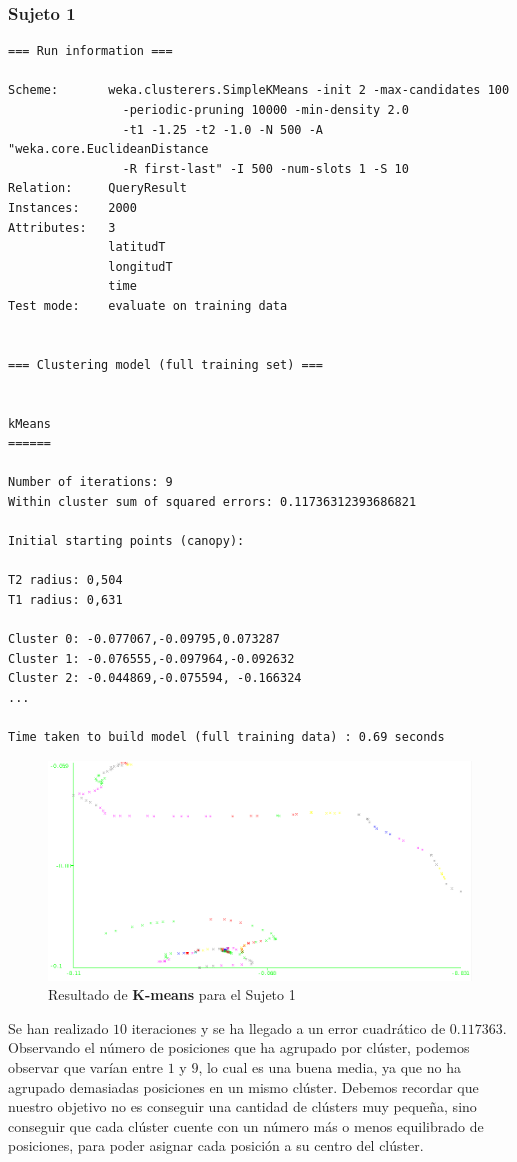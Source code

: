 \documentclass[a4paper, 12pt, spanish]{article}
\begin{document}
\subsubsection{Sujeto 1}

\begin{verbatim}
=== Run information ===

Scheme:       weka.clusterers.SimpleKMeans -init 2 -max-candidates 100 
				-periodic-pruning 10000 -min-density 2.0 
				-t1 -1.25 -t2 -1.0 -N 500 -A "weka.core.EuclideanDistance 
				-R first-last" -I 500 -num-slots 1 -S 10
Relation:     QueryResult
Instances:    2000
Attributes:   3
              latitudT
              longitudT
              time
Test mode:    evaluate on training data


=== Clustering model (full training set) ===


kMeans
======

Number of iterations: 9
Within cluster sum of squared errors: 0.11736312393686821

Initial starting points (canopy):

T2 radius: 0,504     
T1 radius: 0,631  

Cluster 0: -0.077067,-0.09795,0.073287
Cluster 1: -0.076555,-0.097964,-0.092632
Cluster 2: -0.044869,-0.075594, -0.166324
...

Time taken to build model (full training data) : 0.69 seconds
\end{verbatim}


\begin{figure}[H]
	\includegraphics[scale=.5]{../comparativa/kMeansSujeto1.png}
	\caption{Resultado de \textbf{K-means} para el Sujeto 1}
\end{figure}

Se han realizado $10$ iteraciones y se ha llegado a un error cuadr\'atico de $0.117363$. Observando el n\'umero de posiciones que ha agrupado por cl\'uster, podemos observar que var\'ian entre $1$ y $9$, lo cual es una buena media, ya que no ha agrupado demasiadas posiciones en un mismo cl\'uster. Debemos recordar que nuestro objetivo no es conseguir una cantidad de cl\'usters muy peque\~na, sino conseguir que cada cl\'uster cuente con un n\'umero m\'as o menos equilibrado de posiciones, para poder asignar cada posici\'on a su centro del cl\'uster.\\ 
\end{document}
